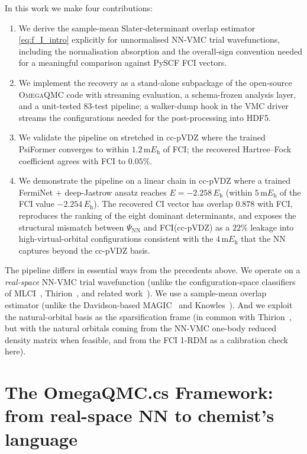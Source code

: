 \documentclass[journal=jctcce,manuscript=article,layout=traditional]{achemso}
\begin{document}
In this work we make four contributions:
\begin{enumerate}
\item We derive the sample-mean Slater-determinant overlap estimator
\eqref{eq:f_I_intro} explicitly for unnormalised NN-VMC trial
wavefunctions, including the normalisation absorption and the
overall-sign convention needed for a meaningful comparison against
PySCF FCI vectors.
\item We implement the recovery as a stand-alone subpackage of the
open-source \textsc{OmegaQMC} code with streaming evaluation, a
schema-frozen analysis layer, and a unit-tested 83-test pipeline; a
walker-dump hook in the VMC driver streams the configurations needed
for the post-processing into HDF5.
\item We validate the pipeline on stretched  in cc-pVDZ where
the trained PsiFormer converges to within $1.2\,\mathrm{m}E_{\mathrm{h}}$
of FCI; the recovered Hartree--Fock coefficient agrees with FCI to
$0.05\%$.
\item We demonstrate the pipeline on a linear  chain in
cc-pVDZ where a trained FermiNet + deep-Jastrow ansatz reaches
$E = -2.258\,E_{\mathrm{h}}$ (within $5\,\mathrm{m}E_{\mathrm{h}}$ of
the FCI value $-2.254\,E_{\mathrm{h}}$). The recovered CI vector has
overlap $0.878$ with FCI, reproduces the ranking of the eight
dominant determinants, and exposes the structural mismatch between
$\Psi_{\mathrm{NN}}$ and FCI(cc-pVDZ) as a $22\%$ leakage into
high-virtual-orbital configurations consistent with the
$4\,\mathrm{m}E_{\mathrm{h}}$ that the NN captures beyond the
cc-pVDZ basis.
\end{enumerate}

The pipeline differs in essential ways from the precedents above. We
operate on a \emph{real-space} NN-VMC trial wavefunction (unlike the
configuration-space classifiers of MLCI~\cite{Coe2018MLCI},
Thirion~\cite{Thirion2025NONNCI}, and related
work~\cite{RBMCI2024,Thompson2026ARNN}). We use a sample-mean
overlap estimator (unlike the Davidson-based
MAGIC~\cite{McClean2015MAGIC} and
Knowles~\cite{Knowles2015compressive}). And we exploit the
natural-orbital basis as the sparsification frame (in common with
Thirion~\cite{Thirion2025NONNCI}, but with the natural orbitals
coming from the NN-VMC one-body reduced density matrix when feasible,
and from the FCI 1-RDM as a calibration check here).

\section{The OmegaQMC.cs Framework: from real-space NN to chemist's language}
\label{sec:framework}
\end{document}
